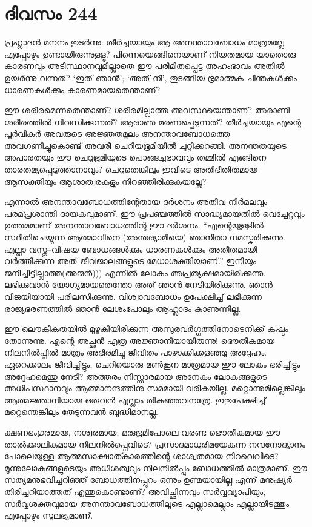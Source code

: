 \section{ദിവസം 244}


പ്രഹ്ലാദന്‍ മനനം തുടര്‍ന്നു: തീര്‍ച്ചയായും ആ അനന്താവബോധം മാത്രമല്ലേ എപ്പോഴും ഉണ്ടായിരുന്നുള്ളൂ? പിന്നെയെങ്ങിനെയാണ് നിയതമായ യാതൊരു കാരണവും അടിസ്ഥാനവുമില്ലാതെ  ഈ പരിമിതപ്പെട്ട അഹംഭാവം അതില്‍ ഉയര്‍ന്നു വന്നത്? ‘ഇത് ഞാന്‍’; ‘അത് നീ’, തുടങ്ങിയ ഭ്രമാത്മക ചിന്തകള്‍ക്കും ധാരണകള്‍ക്കും കാരണമായതെന്താണ്?

ഈ ശരീരമെന്നതെന്താണ്? ശരീരമില്ലാത്ത അവസ്ഥയെന്താണ്? അരാണീ ശരീരത്തില്‍ നിവസിക്കുന്നത്? ആരാണു മരണപ്പെടുന്നത്? തീര്‍ച്ചയായും എന്റെ പൂര്‍വികര്‍ അവരുടെ അജ്ഞതമൂലം അനന്താവബോധത്തെ അവഗണിച്ചുകൊണ്ട് അവരീ ചെറിയഭൂമിയില്‍ ചുറ്റിക്കറങ്ങി.  അനന്തതയുടെ അപാരതയും ഈ ചെറുഭൂമിയുടെ പൊങ്ങച്ചഭാവവും തമ്മില്‍ എങ്ങിനെ താരതമ്യപ്പെടുത്താനാവും? ചെറുതെങ്കിലും ഇവിടെ അതിഭീതിതമായ ആസക്തിയും ആശാത്വരകളും നിറഞ്ഞിരിക്കുകയല്ലേ?

എന്നാല്‍ അനന്താവബോധത്തിന്റേതായ ദര്‍ശനം അതീവ നിര്‍മലവും പരമപ്രശാന്തി ദായകവുമാണ്. ഈ പ്രപഞ്ചത്തില്‍ സാദ്ധ്യമായതില്‍ വെച്ചേറ്റവും ഉത്തമമാണ് അനന്താവബോധത്തിന്റ ഈ ദര്‍ശനം. “എന്റെയുള്ളില്‍ സ്ഥിതിചെയ്യുന്ന ആത്മാവിനെ (അന്തര്യാമിയെ) ഞാനിതാ നമസ്കരിക്കുന്നു. എല്ലാ വസ്തു–വിഷയ ബോധങ്ങള്‍ക്കും ധാരണകള്‍ക്കും അതീതമായി വര്‍ത്തിക്കുന്ന അത് ജീവജാലങ്ങളുടെ മേധാശക്തിയാണ്.” ഇനിയും ജനിച്ചിട്ടില്ലാത്ത(അജന്‍))) എന്നില്‍ ലോകം അപ്രത്യക്ഷമായിരിക്കുന്നു. ലഭിക്കുവാന്‍ യോഗ്യമായതെന്തോ അത് ഞാന്‍ നേടിയിരിക്കുന്നു. ഞാന്‍ വിജയിയായി പരിലസിക്കുന്നു. വിശ്വാവബോധം ഉപേക്ഷിച്ച് ലഭിക്കുന്ന രാജ്യഭരണത്തില്‍ ഞാന്‍ ലേശംപോലും ആഹ്ലാദം കാണുന്നില്ല.

ഈ ലൌകീകതയില്‍ മുഴുകിയിരിക്കുന്ന അസുരവര്‍ഗ്ഗത്തിനോടെനിക്ക് കഷ്ടം തോന്നുന്നു. എന്റെ അച്ഛന്‍ എത്ര അജ്ഞാനിയായിരുന്നു! ഭൌതീകമായ നിലനില്‍പ്പില്‍ മാത്രം അഭിരമിച്ചു ജീവിതം പാഴാക്കിക്കളഞ്ഞു അദ്ദേഹം. ഏറെക്കാലം ജീവിച്ചിട്ടും, ചെറിയൊരു മണ്‍കൂന മാത്രമായ ഈ ലോകം ഭരിച്ചിട്ടും അദ്ദേഹമെന്തു നേടി? അത്തരം നിസ്സാരമായ അനേകം ലോകങ്ങളുടെ അധിപസ്ഥാനവും ആത്മാനന്ദത്തിനു സമമായി വരികയില്ല. മറ്റൊന്നുമില്ലെങ്കിലും ആത്മജ്ഞാനിയായ ഒരുവന്‍ എല്ലാം തികഞ്ഞവനത്രേ. ഇതുപേക്ഷിച്ച് മറ്റെന്തെങ്കിലും തേടുന്നവന്‍ ബുദ്ധിമാനല്ല.
 
ക്ഷണഭംഗുരമായ, നശ്വരമായ, മരുഭൂമിപോലെ വരണ്ട  ഭൌതീകമായ ഈ താല്‍ക്കാലികമായ നിലനില്‍പ്പെവിടെ? പ്രസാദമാധുരിമയേകുന്ന നന്ദനോദ്യാനം പോലെയുള്ള ആത്മസാക്ഷാത്കാരത്തിന്റെ ശാശ്വതമായ നിറവെവിടെ? മൂന്നുലോകങ്ങളുടെയും അധീശത്വവും നിലനില്‍പ്പും ബോധത്തില്‍ മാത്രമാണ്.   ഈ സത്യമനുഭവിച്ചറിഞ്ഞ് ബോധത്തിനപ്പുറം ഒന്നും ഉണ്മയായില്ല എന്ന് മനുഷ്യര്‍ തിരിച്ചറിയാത്തത് എന്തുകൊണ്ടാണ്? അവിച്ഛിന്നവും സര്‍വ്വവ്യാപിയും, സര്‍വ്വശക്തവുമായ അനന്താവബോധത്തിലൂടെ എല്ലാമെല്ലാം എല്ലായിടത്തും എപ്പോഴും സുലഭ്യമാണ്. 

